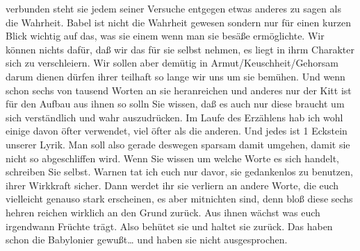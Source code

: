 \documentclass[
]{article}
\begin{document}
verbunden steht sie jedem seiner Versuche entgegen etwas anderes zu
sagen als die Wahrheit. Babel ist nicht die Wahrheit gewesen sondern nur
für einen kurzen Blick wichtig auf das, was sie einem wenn man sie
besäße ermöglichte. Wir können nichts dafür, daß wir das für sie selbst
nehmen, es liegt in ihrm Charakter sich zu verschleiern. Wir sollen aber
demütig in Armut/Keuschheit/Gehorsam darum dienen dürfen ihrer teilhaft
so lange wir uns um sie bemühen. Und wenn schon sechs von tausend Worten
an sie heranreichen und anderes nur der Kitt ist für den Aufbau aus
ihnen so solln Sie wissen, daß es auch nur diese braucht um sich
verständlich und wahr auszudrücken. Im Laufe des Erzählens hab ich wohl
einige davon öfter verwendet, viel öfter als die anderen. Und jedes ist
1 Eckstein unserer Lyrik. Man soll also gerade deswegen sparsam damit
umgehen, damit sie nicht so abgeschliffen wird. Wenn Sie wissen um
welche Worte es sich handelt, schreiben Sie selbst. Warnen tat ich euch
nur davor, sie gedankenlos zu benutzen, ihrer Wirkkraft sicher. Dann
werdet ihr sie verliern an andere Worte, die euch vielleicht genauso
stark erscheinen, es aber mitnichten sind, denn bloß diese sechs hehren
reichen wirklich an den Grund zurück. Aus ihnen wächst was euch
irgendwann Früchte trägt. Also behütet sie und haltet sie zurück. Das
haben schon die Babylonier gewußt\ldots{} und haben sie nicht
ausgesprochen.
\end{document}
